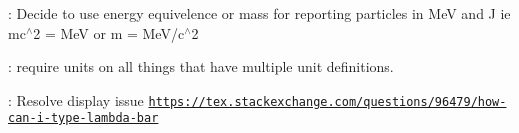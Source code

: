 
\begin{DoxyRefList}
\item[\label{todo__todo000001}%
\Hypertarget{todo__todo000001}%
Module \hyperlink{group___n_i_s_t_const}{N\+I\+S\+T\+Const} ]\+: Decide to use energy equivelence or mass for reporting particles in MeV and J ie mc$^\wedge$2 = MeV or m = Me\+V/c$^\wedge$2 

\+: require units on all things that have multiple unit definitions. 

\+: Resolve  display issue \href{https://tex.stackexchange.com/questions/96479/how-can-i-type-lambda-bar}{\tt https\+://tex.\+stackexchange.\+com/questions/96479/how-\/can-\/i-\/type-\/lambda-\/bar} 
\end{DoxyRefList}